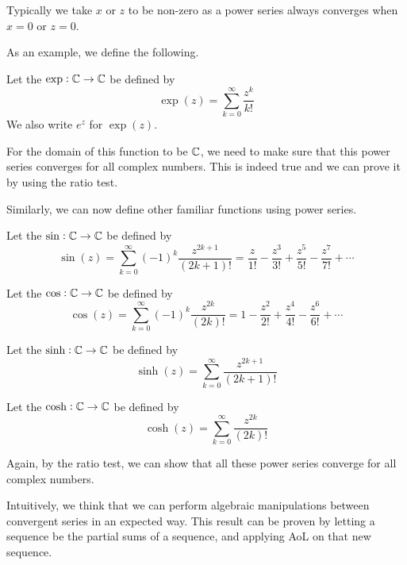 \documentclass{styles/tufte}
\begin{document}
    Typically we take $x$ or $z$ to be non-zero as a power series always converges when $x = 0$ or $z = 0$.
    
    As an example, we define the following.
    
    \begin{definition}{}{}
      Let the  $\exp : \mathbb{C} \to \mathbb{C}$ be defined by
      \[ \exp(z) = \sum_{k=0}^\infty \frac{z^k}{k!} \]
      We also write $e^z$ for $\exp(z)$.
    \end{definition}
    
    For the domain of this function to be $\mathbb{C}$, we need to make sure that this power series converges for all complex numbers. This is indeed true and we can prove it by using the ratio test.
    
    Similarly, we can now define other familiar functions using power series.
    
    \begin{definition}{}{}
      Let the  $\sin : \mathbb{C} \to \mathbb{C}$ be defined by
      \[ \sin(z) = \sum_{k=0}^\infty (-1)^k \frac{z^{2k+1}}{(2k + 1)!}
                 = \frac{z}{1!} - \frac{z^3}{3!} + \frac{z^5}{5!} - \frac{z^7}{7!} + \cdots \]
    \end{definition}
    
    \begin{definition}{}{}
      Let the  $\cos : \mathbb{C} \to \mathbb{C}$ be defined by
      \[ \cos(z) = \sum_{k=0}^\infty (-1)^k \frac{z^{2k}}{(2k)!}
                 = 1 - \frac{z^2}{2!} + \frac{z^4}{4!} - \frac{z^6}{6!} + \cdots \]
    \end{definition}
    
    \begin{definition}{}{}
      Let the  $\sinh : \mathbb{C} \to \mathbb{C}$ be defined by
      \[ \sinh(z) = \sum_{k=0}^\infty \frac{z^{2k+1}}{(2k + 1)!} \]
    \end{definition}
    
    \begin{definition}{}{}
      Let the  $\cosh : \mathbb{C} \to \mathbb{C}$ be defined by
      \[ \cosh(z) = \sum_{k=0}^\infty \frac{z^{2k}}{(2k)!} \]
    \end{definition}
    
    Again, by the ratio test, we can show that all these power series converge for all complex numbers.
    
    Intuitively, we think that we can perform algebraic manipulations between convergent series in an expected way. This result can be proven by letting a sequence be the partial sums of a sequence, and applying AoL on that new sequence.
    
\end{document}

